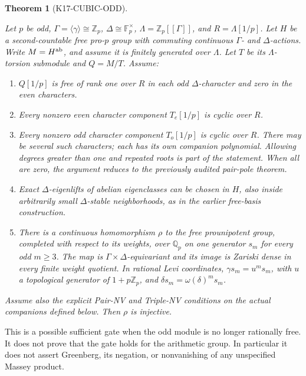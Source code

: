 \documentclass[11pt,a4paper]{article}
\newtheorem{theorem}{Theorem}[section]
\theoremstyle{definition}
\begin{document}
\begin{theorem}[K17-CUBIC-ODD]
\label{thm:odd-torsion-cubic}

Let \(p\) be odd, \(\Gamma=\langle\gamma\rangle\cong\mathbb Z_p\), \(\Delta\cong\mathbb F_p^\times\), \(\Lambda=\mathbb Z_p[[\Gamma]]\), and \(R=\Lambda[1/p]\). Let \(H\) be a second-countable free pro-\(p\) group with commuting continuous \(\Gamma\)- and \(\Delta\)-actions. Write \(M=H^{\rm ab}\), and assume it is finitely generated over \(\Lambda\). Let \(T\) be its \(\Lambda\)-torsion submodule and \(Q=M/T\). Assume:

\begin{enumerate}
\item \(Q[1/p]\) is free of rank one over \(R\) in each odd \(\Delta\)-character and zero in the even characters.
\item Every nonzero even character component \(T_e[1/p]\) is cyclic over \(R\).
\item Every nonzero odd character component \(T_o[1/p]\) is cyclic over \(R\). There may be several such characters; each has its own companion polynomial. Allowing degrees greater than one and repeated roots is part of the statement. When all are zero, the argument reduces to the previously audited pair-pole theorem.
\item Exact \(\Delta\)-eigenlifts of abelian eigenclasses can be chosen in \(H\), also inside arbitrarily small \(\Delta\)-stable neighborhoods, as in the earlier free-basis construction.
\item There is a continuous homomorphism \(\rho\) to the free prounipotent group, completed with respect to its weights, over \(\mathbb Q_p\) on one generator \(s_m\) for every odd \(m\ge3\). The map is \(\Gamma\times\Delta\)-equivariant and its image is Zariski dense in every finite weight quotient. In rational Levi coordinates, \(\gamma s_m=u^m s_m\), with \(u\) a topological generator of \(1+p\mathbb Z_p\), and \(\delta s_m=\omega(\delta)^m s_m\).
\end{enumerate}

Assume also the explicit Pair-NV and Triple-NV conditions on the actual companions defined below. Then \(\rho\) is injective.

\end{theorem}
This is a possible sufficient gate when the odd module is no longer rationally free. It does not prove that the gate holds for the arithmetic group. In particular it does not assert Greenberg, its negation, or nonvanishing of any unspecified Massey product.
\end{document}
